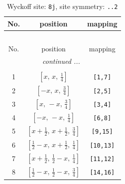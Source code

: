 \documentclass[fleqn,8pt]{jsarticle}
\begin{document}
\begin{longtable}{ccc}
\caption{Wyckoff site: {\tt 8j}, site symmetry: {\tt ..2}}
 \\
 \hline \hline
No. & position & mapping \\ \hline \endfirsthead

\multicolumn{2}{l}{\tablename\ \thetable{}} \\
 \hline \hline
No. & position & mapping \\ \hline \endhead

 \hline \hline
\multicolumn{2}{r}{\footnotesize\it continued ...} \\ \endfoot

 \hline \hline
\multicolumn{2}{r}{} \\ \endlastfoot

1 & $\left[ x,\, x,\, \frac{1}{4} \right]$ & {\tt [1,7]} \\ \hline
2 & $\left[ - x,\, x,\, \frac{3}{4} \right]$ & {\tt [2,5]} \\ \hline
3 & $\left[ x,\, - x,\, \frac{3}{4} \right]$ & {\tt [3,4]} \\ \hline
4 & $\left[ - x,\, - x,\, \frac{1}{4} \right]$ & {\tt [6,8]} \\ \hline
5 & $\left[ x + \frac{1}{2},\, x + \frac{1}{2},\, \frac{3}{4} \right]$ & {\tt [9,15]} \\ \hline
6 & $\left[ \frac{1}{2} - x,\, x + \frac{1}{2},\, \frac{1}{4} \right]$ & {\tt [10,13]} \\ \hline
7 & $\left[ x + \frac{1}{2},\, \frac{1}{2} - x,\, \frac{1}{4} \right]$ & {\tt [11,12]} \\ \hline
8 & $\left[ \frac{1}{2} - x,\, \frac{1}{2} - x,\, \frac{3}{4} \right]$ & {\tt [14,16]} \\
\end{longtable}
\renewcommand{\arraystretch}{1.2}
\end{document}
